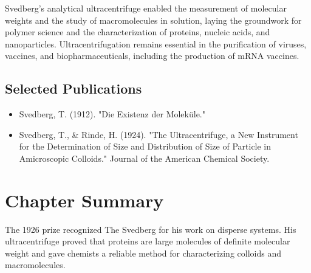 Svedberg's analytical ultracentrifuge enabled the measurement of molecular weights and the study of macromolecules in solution, laying the groundwork for polymer science and the characterization of proteins, nucleic acids, and nanoparticles. Ultracentrifugation remains essential in the purification of viruses, vaccines, and biopharmaceuticals, including the production of mRNA vaccines.

\subsection*{Selected Publications}

\begin{itemize}

\item Svedberg, T. (1912). "Die Existenz der Moleküle."

\item Svedberg, T., \& Rinde, H. (1924). "The Ultracentrifuge, a New Instrument for the Determination of Size and Distribution of Size of Particle in Amicroscopic Colloids." Journal of the American Chemical Society.

\end{itemize}

\clearpage

\section*{Chapter Summary}

The 1926 prize recognized The Svedberg for his work on disperse systems. His ultracentrifuge proved that proteins are large molecules of definite molecular weight and gave chemists a reliable method for characterizing colloids and macromolecules.
